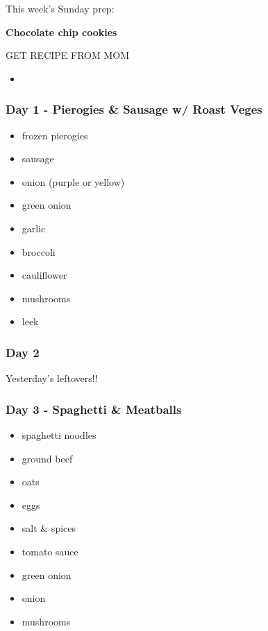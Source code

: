 \documentclass[11pt, a4paper]{article}
\begin{document}
This week's Sunday prep:
\par
\vspace{1pc}
\noindent\textbf{Chocolate chip cookies}
\par
GET RECIPE FROM MOM
\begin{itemize}
\item %
\end{itemize}

\subsubsection{Day 1 - Pierogies \& Sausage w/ Roast Veges}
\vspace{1pc}
\begin{itemize}
\item frozen pierogies
\item sausage
\item onion (purple or yellow)
\item green onion
\item garlic
\item broccoli
\item cauliflower
\item mushrooms
\item leek
\end{itemize}

\subsubsection{Day 2}
\vspace{1pc}
Yesterday's leftovers!!
\vspace{2pc}

\subsubsection{Day 3 - Spaghetti \& Meatballs}
\vspace{1pc}
\begin{itemize}
\item spaghetti noodles
\item ground beef
\item oats
\item eggs
\item salt \& spices
\item tomato sauce
\item green onion
\item onion
\item mushrooms
\end{itemize}
\end{document}
